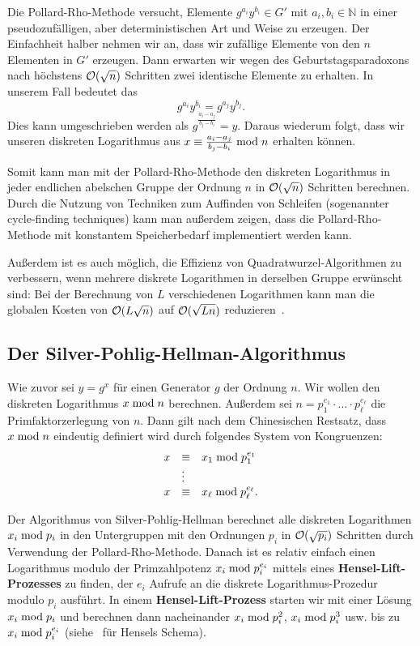 \begin{refsegment}
Die Pollard-Rho-Methode versucht, Elemente $g^{a_i}y^{b_i} \in G'$ mit $a_i, b_i \in \mathbb{N}$ in einer pseudozufälligen, aber deterministischen Art und Weise zu erzeugen. Der Einfachheit halber nehmen wir an, dass wir zufällige Elemente von den $n$ Elementen in $G'$ erzeugen. Dann erwarten wir wegen des Geburtstagsparadoxons nach höchstens ${\cal O}(\sqrt n)$ Schritten zwei identische Elemente zu erhalten. In unserem Fall bedeutet das
$$
  g^{a_i}y^{b_i} = g^{a_j}y^{b_j}.
$$
Dies kann umgeschrieben werden als $g^{\frac{a_i-a_j}{b_j-b_i}} = y$. Daraus wiederum folgt, dass wir unseren diskreten Logarithmus aus $x \equiv \frac{a_i-a_j}{b_j-b_i} \hspace{1mm}{\rm mod}\hspace{1mm} n$ erhalten können.

Somit kann man mit der Pollard-Rho-Methode den diskreten Logarithmus in jeder endlichen abelschen Gruppe der Ordnung $n$ in ${\cal O}(\sqrt n)$ Schritten berechnen. Durch die Nutzung von Techniken zum Auffinden von Schleifen (sogenannter cycle-finding techniques) kann man außerdem zeigen, dass die Pollard-Rho-Methode mit konstantem Speicherbedarf implementiert werden kann.

Außerdem ist es auch möglich, die Effizienz von Quadratwurzel-Algorithmen zu verbessern, wenn mehrere diskrete Logarithmen in derselben Gruppe erwünscht sind: Bei der Berechnung von $L$ verschiedenen Logarithmen kann man die globalen Kosten von ${\cal O} (L\sqrt{n})$ auf ${\cal O} (\sqrt{Ln})$ reduzieren~\cite{multiple2014}.


\subsection{Der Silver-Pohlig-Hellman-Algorithmus}
Wie zuvor sei $y = g^{x}$ für einen Generator $g$ der Ordnung $n$. Wir wollen den diskreten Logarithmus $x \hspace{1mm}{\rm mod}\hspace{1mm} n$ berechnen. Außerdem sei $n=p_1^{e_1} \cdot \ldots \cdot p_{\ell}^{e_{\ell}}$ die Primfaktorzerlegung von $n$. Dann gilt nach dem Chinesischen Restsatz, dass $x \hspace{1mm}{\rm mod}\hspace{1mm} n$ eindeutig definiert wird durch folgendes System von Kongruenzen:
\begin{equation}
\label{crt}
\begin{array}{lll}
  x & \equiv & x_1 \hspace{1mm}{\rm mod}\hspace{1mm} p_1^{e_1}\\
    & \vdots\\
  x & \equiv & x_{\ell} \hspace{1mm}{\rm mod}\hspace{1mm} p_{\ell}^{e_{\ell}}.	
\end{array}
\end{equation}

Der Algorithmus von Silver-Pohlig-Hellman berechnet alle diskreten Logarithmen $x_i \hspace{1mm}{\rm mod}\hspace{1mm} p_i$ in den Untergruppen mit den Ordnungen $p_i$ in ${\cal O}(\sqrt{p_i})$ Schritten durch Verwendung der Pollard-Rho-Methode. Danach ist es relativ einfach einen Logarithmus modulo der Primzahlpotenz $x_i \hspace{1mm}{\rm mod}\hspace{1mm} p_i^{e_i}$ mittels eines \textbf{Hensel-Lift-Prozesses} zu finden, der $e_i$ Aufrufe an die diskrete Logarithmus-Prozedur modulo $p_i$ ausführt. In einem \textbf{Hensel-Lift-Prozess} starten wir mit einer Lösung $x_i \hspace{1mm}{\rm mod}\hspace{1mm} p_i$ und berechnen dann nacheinander $x_i \hspace{1mm}{\rm mod}\hspace{1mm} p_i^2$, $x_i \hspace{1mm}{\rm mod}\hspace{1mm} p_i^3$ usw. bis zu $x_i \hspace{1mm}{\rm mod}\hspace{1mm} p_i^{e_i}$ (siehe~\cite{May2013} für Hensels Schema).


\end{refsegment}
